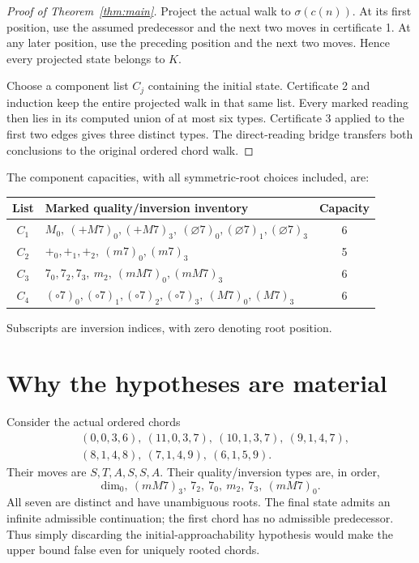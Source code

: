 \documentclass[11pt]{article}
\begin{document}
\begin{proof}[Proof of Theorem~\ref{thm:main}]
Project the actual walk to $\sigma(c(n))$. At its first position, use the
assumed predecessor and the next two moves in certificate 1. At any later
position, use the preceding position and the next two moves. Hence every
projected state belongs to $K$.

Choose a component list $C_j$ containing the initial state. Certificate 2
and induction keep the entire projected walk in that same list. Every marked
reading then lies in its computed union of at most six types. Certificate 3
applied to the first two edges gives three distinct types. The direct-reading
bridge transfers both conclusions to the original ordered chord walk.
\end{proof}

The component capacities, with all symmetric-root choices included, are:
\begin{center}\small
\begin{tabular}{@{}clc@{}}\toprule
List&Marked quality/inversion inventory&Capacity\\\midrule
$C_1$&$M_0,\ (+M7)_0,(+M7)_3,\ (\varnothing7)_0,(\varnothing7)_1,(\varnothing7)_3$&6\\
$C_2$&$+_0,+_1,+_2,\ (m7)_0,(m7)_3$&5\\
$C_3$&$7_0,7_2,7_3,\ m_2,\ (mM7)_0,(mM7)_3$&6\\
$C_4$&$(\circ7)_0,(\circ7)_1,(\circ7)_2,(\circ7)_3,\ (M7)_0,(M7)_3$&6\\\bottomrule
\end{tabular}
\end{center}
Subscripts are inversion indices, with zero denoting root position.

\section{Why the hypotheses are material}
Consider the actual ordered chords
\[
\begin{aligned}
&(0,0,3,6),\ (11,0,3,7),\ (10,1,3,7),\ (9,1,4,7),\\
&(8,1,4,8),\ (7,1,4,9),\ (6,1,5,9).
\end{aligned}
\]
Their moves are $S,T,A,S,S,A$. Their quality/inversion types are, in order,
\[
\mathrm{dim}_0,\ (mM7)_3,\ 7_2,\ 7_0,\ m_2,\ 7_3,\ (mM7)_0.
\]
All seven are distinct and have unambiguous roots. The final state admits an
infinite admissible continuation; the first chord has no admissible
predecessor. Thus simply discarding the initial-approachability hypothesis
would make the upper bound false even for uniquely rooted chords.
\end{document}
